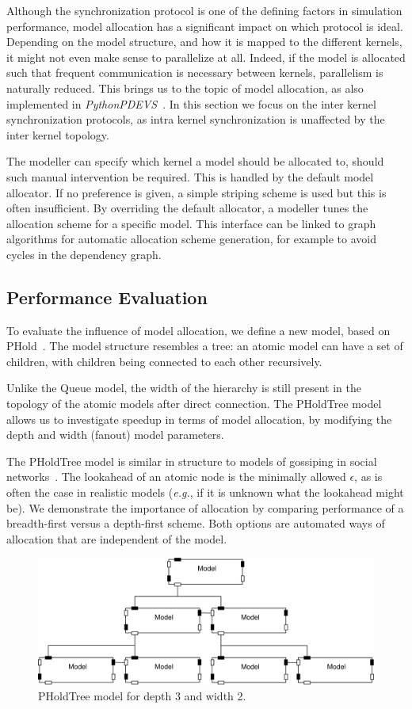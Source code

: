 Although the synchronization protocol is one of the defining factors in simulation performance, model allocation has a significant impact on which protocol is ideal.
Depending on the model structure, and how it is mapped to the different kernels, it might not even make sense to parallelize at all.
Indeed, if the model is allocated such that frequent communication is necessary between kernels, parallelism is naturally reduced.
This brings us to the topic of model allocation, as also implemented in \textit{PythonPDEVS}~\cite{PythonPDEVS2}.
In this section we focus on the inter kernel synchronization protocols, as intra kernel synchronization is unaffected by the inter kernel topology.

The modeller can specify which kernel a model should be allocated to, should such manual intervention be required.
This is handled by the default model allocator.
If no preference is given, a simple striping scheme is used but this is often insufficient.
By overriding the default allocator, a modeller tunes the allocation scheme for a specific model.
This interface can be linked to graph algorithms for automatic allocation scheme generation, for example to avoid cycles in the dependency graph.

\subsection{Performance Evaluation}
To evaluate the influence of model allocation, we define a new model, based on PHold~\cite{PHOLD}.
The model structure resembles a tree: an atomic model can have a set of children, with children being connected to each other recursively.

Unlike the Queue model, the width of the hierarchy is still present in the topology of the atomic models after direct connection.
The PHoldTree model allows us to investigate speedup in terms of model allocation, by modifying the depth and width (fanout) model parameters.

The PHoldTree model is similar in structure to models of gossiping in social networks~\cite{Gossip}.
The lookahead of an atomic node is the minimally allowed $\epsilon$, as is often the case in realistic models (\textit{e.g.}, if it is unknown what the lookahead might be).
We demonstrate the importance of allocation by comparing performance of a breadth-first versus a depth-first scheme.
Both options are automated ways of allocation that are independent of the model.

\begin{figure}
    \center
    \includegraphics[width=\columnwidth]{fig/pholdtree.pdf}
    \caption{PHoldTree model for depth 3 and width 2.}
    \label{fig:PHOLDTree_model}
\end{figure}


